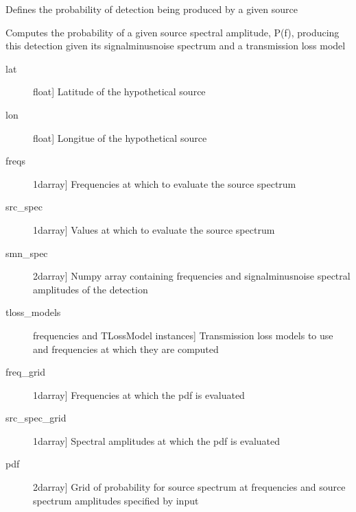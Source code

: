 \documentclass[letterpaper,10pt,english]{sphinxmanual}
\begin{document}
\begin{fulllineitems}
\begin{fulllineitems}
\label{\detokenize{infrapy.propagation:infrapy.propagation.likelihoods.InfrasoundDetection.src_spec_pdf}}
Defines the probability of detection being produced by a given source

Computes the probability of a given source spectral amplitude, P(f),
producing this detection given its signal\sphinxhyphen{}minus\sphinxhyphen{}noise spectrum and
a transmission loss model
\begin{description}
\item[{lat}] \leavevmode{[}float{]}
Latitude of the hypothetical source

\item[{lon}] \leavevmode{[}float{]}
Longitue of the hypothetical source

\item[{freqs}] \leavevmode{[}1darray{]}
Frequencies at which to evaluate the source spectrum

\item[{src\_spec}] \leavevmode{[}1darray{]}
Values at which to evaluate the source spectrum

\item[{smn\_spec}] \leavevmode{[}2darray{]}
Numpy array containing frequencies and signal\sphinxhyphen{}minus\sphinxhyphen{}noise spectral amplitudes of the detection

\item[{tloss\_models}] \leavevmode{[}frequencies and TLossModel instances{]}
Transmission loss models to use and frequencies at which they are computed

\end{description}
\begin{description}
\item[{freq\_grid}] \leavevmode{[}1darray{]}
Frequencies at which the pdf is evaluated

\item[{src\_spec\_grid}] \leavevmode{[}1darray{]}
Spectral amplitudes at which the pdf is evaluated

\item[{pdf}] \leavevmode{[}2darray{]}
Grid of probability for source spectrum at frequencies and source spectrum amplitudes specified by input

\end{description}


\end{fulllineitems}
\end{fulllineitems}
\end{document}
